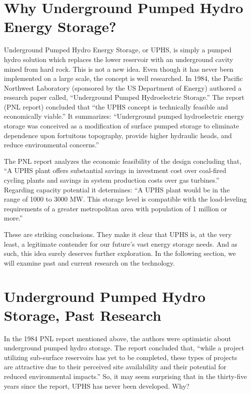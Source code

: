 \documentclass[hidelinks,12pt,a4paper]{article}
\begin{document}
\pagebreak[4]
\section{Why Underground Pumped Hydro Energy Storage?}
Underground Pumped Hydro Energy Storage, or UPHS, is simply a pumped hydro solution which replaces the lower reservoir with an underground cavity mined from hard rock. This is not a new idea. Even though it has never been implemented on a large scale, the concept is well researched. In 1984, the Pacific Northwest Laboratory (sponsored by the US Department of Energy) authored a research paper called, “Underground Pumped Hydroelectric Storage.” The report (PNL report) concluded that “the UPHS concept is technically feasible and economically viable.” \cite{UndergroundPumpedHydroelectricStorage} It summarizes: “Underground pumped hydroelectric energy storage was conceived as a modification of surface pumped storage to eliminate dependence upon fortuitous topography, provide higher hydraulic heads, and reduce environmental concerns.” \cite{UndergroundPumpedHydroelectricStorage}

The PNL report analyzes the economic feasibility of the design concluding that, “A UPHS plant offers substantial savings in investment cost over coal-fired cycling plants and savings in system production costs over gas turbines.” \cite{UndergroundPumpedHydroelectricStorage} Regarding capacity potential it determines: “A UPHS plant would be in the range of 1000 to 3000 MW. This storage level is compatible with the load-leveling requirements of a greater metropolitan area with population of 1 million or more.” \cite{SubSurfacePumpedHydroelectricStorage}

These are striking conclusions. They make it clear that UPHS is, at the very least, a legitimate contender for our future's vast energy storage needs. And as such, this idea surely deserves further exploration. In the following section, we will examine past and current research on the technology.

\pagebreak[4]
\section{Underground Pumped Hydro Storage, Past Research}
In the 1984 PNL report mentioned above, the authors were optimistic about underground pumped hydro storage. The report concluded that, “while a project utilizing sub-surface reservoirs has yet to be completed, these types of projects are attractive due to their perceived site availability and their potential for reduced environmental impacts.” \cite{SubSurfacePumpedHydroelectricStorage} So, it may seem surprising that in the thirty-five years since the report, UPHS has never been developed. Why?
\end{document}
